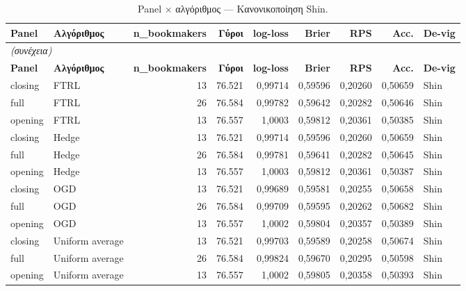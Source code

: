 {\scriptsize
\begin{longtable}{@{}llrrrrrrl@{}}
\caption{Panel $\times$ αλγόριθμος --- Κανονικοποίηση Shin.}\label{app:opening_vs_cΚανο}\\
\toprule \textbf{Panel} & \textbf{Αλγόριθμος} & \textbf{n\_bookmakers} & \textbf{Γύροι} & \textbf{log-loss} & \textbf{Brier} & \textbf{RPS} & \textbf{Acc.} & \textbf{De-vig} \\\midrule\endfirsthead
\multicolumn{9}{l}{\emph{(συνέχεια)}}\\\toprule \textbf{Panel} & \textbf{Αλγόριθμος} & \textbf{n\_bookmakers} & \textbf{Γύροι} & \textbf{log-loss} & \textbf{Brier} & \textbf{RPS} & \textbf{Acc.} & \textbf{De-vig} \\\midrule\endhead
\bottomrule\endfoot
closing & FTRL & 13 & 76.521 & 0,99714 & 0,59596 & 0,20260 & 0,50659 & Shin \\
full & FTRL & 26 & 76.584 & 0,99782 & 0,59642 & 0,20282 & 0,50646 & Shin \\
opening & FTRL & 13 & 76.557 & 1,0003 & 0,59812 & 0,20361 & 0,50385 & Shin \\
closing & Hedge & 13 & 76.521 & 0,99714 & 0,59596 & 0,20260 & 0,50659 & Shin \\
full & Hedge & 26 & 76.584 & 0,99781 & 0,59641 & 0,20282 & 0,50645 & Shin \\
opening & Hedge & 13 & 76.557 & 1,0003 & 0,59812 & 0,20361 & 0,50387 & Shin \\
closing & OGD & 13 & 76.521 & 0,99689 & 0,59581 & 0,20255 & 0,50658 & Shin \\
full & OGD & 26 & 76.584 & 0,99709 & 0,59595 & 0,20262 & 0,50682 & Shin \\
opening & OGD & 13 & 76.557 & 1,0002 & 0,59804 & 0,20357 & 0,50389 & Shin \\
closing & Uniform average & 13 & 76.521 & 0,99703 & 0,59589 & 0,20258 & 0,50674 & Shin \\
full & Uniform average & 26 & 76.584 & 0,99824 & 0,59670 & 0,20295 & 0,50598 & Shin \\
opening & Uniform average & 13 & 76.557 & 1,0002 & 0,59805 & 0,20358 & 0,50393 & Shin \\
\end{longtable}
}

